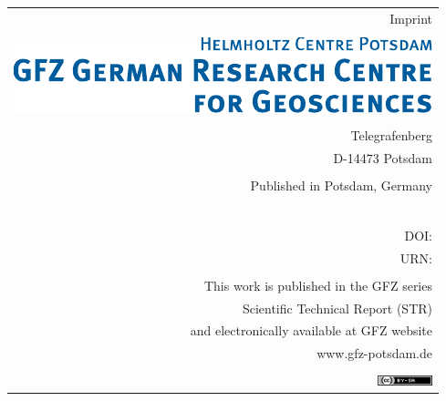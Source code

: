 {{		%
		\begin{flushright}\vfill
			\begin{tabular}{r}
				{\normalsize Imprint} \\
				\\
				\includegraphics{gfzlogo_ur.pdf} \\
				\\
				Telegrafenberg \\
				D-14473 Potsdam  \\ 
				\\
				Published in Potsdam, Germany \\
				\rstPublicationMonth\ \rstPublicationYear \\
				\rstIssn \\
				DOI: \href{\rstDoiUrl}{\rstDoiStr} \\
				URN: \rstUrn \\
				\\
				This work is published in the GFZ series \\
				Scientific Technical Report (STR) \\
				and electronically available at GFZ website \\
				www.gfz-potsdam.de \\
				\\
				\href{http://creativecommons.org/licenses/by-sa/4.0/}{\includegraphics{creative_common1.png}}
			\end{tabular}
		\end{flushright}
	}
	\thispagestyle{empty}
	\clearpage

	\thispagestyle{empty}
	\clearpage
}
\makeatother